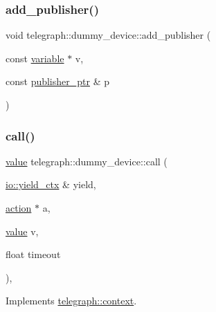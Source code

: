 \subsubsection{\texorpdfstring{add\+\_\+publisher()}{add\_publisher()}}
{\footnotesize\ttfamily void telegraph\+::dummy\+\_\+device\+::add\+\_\+publisher (\begin{DoxyParamCaption}\item[{const \hyperlink{classtelegraph_1_1variable}{variable} $\ast$}]{v,  }\item[{const \hyperlink{namespacetelegraph_aff5109352406dd9a8cd38f431f808bc5}{publisher\+\_\+ptr} \&}]{p }\end{DoxyParamCaption})}

\mbox{\label{classtelegraph_1_1dummy__device_af2e3be5731809d7693cb6a4607e5e3f6}} 
\subsubsection{\texorpdfstring{call()}{call()}\hspace{0.1cm}{\footnotesize\ttfamily [1/2]}}
{\footnotesize\ttfamily \hyperlink{classtelegraph_1_1value}{value} telegraph\+::dummy\+\_\+device\+::call (\begin{DoxyParamCaption}\item[{\hyperlink{structboost_1_1asio_1_1yield__ctx}{io\+::yield\+\_\+ctx} \&}]{yield,  }\item[{\hyperlink{classtelegraph_1_1action}{action} $\ast$}]{a,  }\item[{\hyperlink{classtelegraph_1_1value}{value}}]{v,  }\item[{float}]{timeout }\end{DoxyParamCaption})\hspace{0.3cm}{\ttfamily [override]}, {\ttfamily [virtual]}}



Implements \hyperlink{classtelegraph_1_1context_a72da471eb635e5505b10d2f1103359ac}{telegraph\+::context}.

\mbox{\label{classtelegraph_1_1dummy__device_ab037df44b352953369760dd6071d84b5}} 
